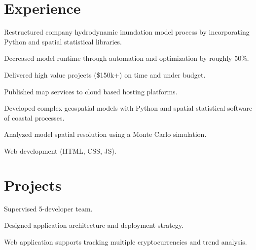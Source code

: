 \documentclass[]{sanchagrins-resume}
\begin{document}
\begin{minipage}[t]{0.63\textwidth} 


\section{Experience}
\vspace{\topsep}
\begin{tightemize}
\item Restructured company hydrodynamic inundation model process by incorporating Python and spatial statistical libraries.
\item Decreased model runtime through automation and optimization by roughly 50\%.
\item Delivered high value projects (\$150k+) on time and under budget.
\item Published map services to cloud based hosting platforms.
\end{tightemize}

\sectionsep
{}
\begin{tightemize}
\item Developed complex geospatial models with Python and spatial statistical software of coastal processes.
\item Analyzed model spatial resolution using a Monte Carlo simulation.
\item Web development (HTML, CSS, JS).
\end{tightemize}
\sectionsep


\section{Projects}

\begin{tightemize}
\item Supervised 5-developer team.
\item Designed application architecture and deployment strategy.
\item Web application supports tracking multiple cryptocurrencies and trend analysis. 
\end{tightemize}
\sectionsep


\end{minipage}
\end{document}
